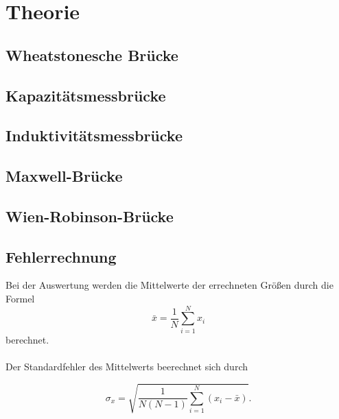 \section{Theorie}
\label{sec:Theorie}
\subsection{Wheatstonesche Brücke}
\subsection{Kapazitätsmessbrücke}
\subsection{Induktivitätsmessbrücke}
\subsection{Maxwell-Brücke}
\subsection{Wien-Robinson-Brücke}
\subsection{Fehlerrechnung}
Bei der Auswertung werden die Mittelwerte 
der errechneten Größen durch die Formel
\begin{equation}
    \bar{x}=\frac{1}{N}\sum_{i=1}^N x_i
\end{equation}
berechnet.\\ 
\\
Der Standardfehler des Mittelwerts beerechnet sich durch

 \begin{equation}
     \sigma_x=\sqrt{\frac{1}{N(N-1)}\sum_{i=1}^N (x_i-\bar{x})}.
 \end{equation}
